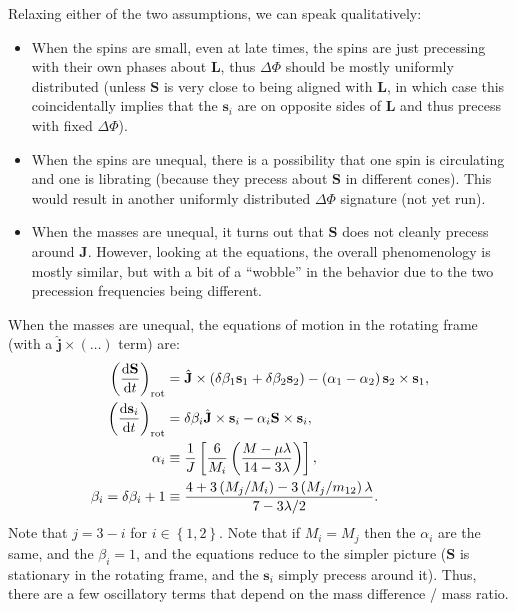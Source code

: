 \documentclass[11pt,
        usenames, %
        dvipsnames %
    ]{article}
\newcommand*{\rd}[2]{\frac{\mathrm{d}#1}{\mathrm{d}#2}}
\newcommand*{\bm}[1]{\boldsymbol{\mathbf{#1}}}
\newcommand*{\uv}[1]{\hat{\bm{#1}}}
\newcommand*{\p}[1]{\left(#1\right)}
\newcommand*{\s}[1]{\left[#1\right]}
\newcommand*{\z}[1]{\left\{#1\right\}}
\begin{document}
Relaxing either of the two assumptions, we can speak qualitatively:
\begin{itemize}
    \item When the spins are small, even at late times, the spins are just
        precessing with their own phases about $\bm{L}$, thus $\Delta \Phi$
        should be mostly uniformly distributed (unless $\bm{S}$ is very close to
        being aligned with $\bm{L}$, in which case this coincidentally implies
        that the $\bm{s}_i$ are on opposite sides of $\bm{L}$ and thus precess
        with fixed $\Delta \Phi$).

    \item When the spins are unequal, there is a possibility that one spin is
        circulating and one is librating (because they precess about $\bm{S}$ in
        different cones). This would result in another uniformly distributed
        $\Delta \Phi$ signature (not yet run).

    \item When the masses are unequal, it turns out that $\bm{S}$ does not
        cleanly precess around $\bm{J}$. However, looking at the equations, the
        overall phenomenology is mostly similar, but with a bit of a ``wobble''
        in the behavior due to the two precession frequencies being different.
\end{itemize}

When the masses are unequal, the equations of motion in the rotating frame (with
a $\uv{j} \times (\dots)$ term) are:
\begin{align}
    \p{\rd{\bm{S}}{t}}_{\rm rot} &= \uv{J} \times
        \p{\delta \beta_1 \bm{s}_1 + \delta \beta_2 \bm{s}_2}
        - \p{\alpha_1 - \alpha_2}\bm{s}_2 \times \bm{s}_1,\\
    \p{\rd{\bm{s}_i}{t}}_{\rm rot} &=
        \delta \beta_i \uv{J} \times \bm{s}_i
        - \alpha_i \bm{S} \times \bm{s}_i,\\
    \alpha_i &\equiv \frac{1}{J}
        \s{\frac{6}{M_i}\p{\frac{M - \mu \lambda}{14 - 3\lambda}}},\\
    \beta_{i} = \delta \beta_i + 1 &\equiv
        \frac{4 + 3\p{M_j/ M_i} - 3\p{M_j/m_{12}}\lambda}{7 - 3\lambda/2}.
\end{align}
Note that $j = 3 - i$ for $i \in \z{1, 2}$. Note that if $M_i = M_j$ then
the $\alpha_i$ are the same, and the $\beta_i = 1$, and the equations reduce to
the simpler picture ($\bm{S}$ is stationary in the rotating frame, and the
$\bm{s}_i$ simply precess around it). Thus, there are a few oscillatory terms
that depend on the mass difference / mass ratio.
\end{document}
